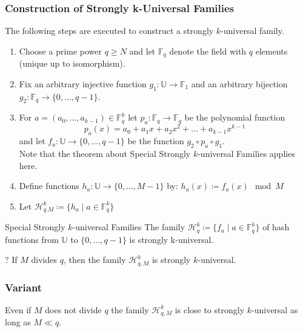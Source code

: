\documentclass[english]{panikzettel}
\begin{document}
\subsubsection{Construction of Strongly k-Universal Families}
The following steps are executed to construct a strongly $k$-universal family.
\begin{enumerate}
\item Choose a prime power $q\geq N$ and let $\mathbb{F}_q$ denote the field with $q$ elements (unique up to isomorphism).
\item Fix an arbitrary injective function $g_1:\mathbb{U}\to\mathbb{F}_1$ and an arbitrary bijection $g_2:\mathbb{F}_q\to \{0,...,q-1 \}$.
\item For $a=(a_0,...,a_{k-1})\in\mathbb{F}_q^k$ let $p_a:\mathbb{F}_q\to \mathbb{F}_q$ be the polynomial function
\[
p_a(x)=a_0+a_1x+a_2x^2+...+a_{k-1}x^{k-1}
\]
and let $f_a:\mathbb{U}\to \{0,...,q-1 \}$ be the function $g_2\circ p_a\circ g_1$.\\
Note that the theorem about Special Strongly $k$-universal Families applies here.
\item Define functions $h_a:\mathbb{U}\to \{0,...,M-1\}$ by: $h_a(x)\coloneqq f_a(x) \mod M$
\item Let $\mathcal{H}_{q.M}^k\coloneqq \{h_a\mid a\in \mathbb{F}_q^k \}$
\end{enumerate}

\begin{halfboxl}
\vspace{-\baselineskip}
	\begin{theo}{Special Strongly $k$-universal Families}
	The family $\mathcal{H}_q^k\coloneqq \{f_a\mid a\in \mathbb{F}_q^k \}$ of hash functions from $\mathbb{U}$ to $\{0,...,q-1 \}$ is strongly k-universal.
	\end{theo}
\end{halfboxl}
\begin{halfboxr}
\vspace{-\baselineskip}
	\begin{theo}{?}
	If $M$ divides $q$, then the family $\mathcal{H}_{q,M}^k$ is strongly $k$-universal.
	\end{theo}
\end{halfboxr}

\subsubsection{Variant}
Even if $M$ does not divide $q$ the family $\mathcal{H}_{q,M}^k$ is close to strongly $k$-universal as long as $M\ll q$.
\end{document}
